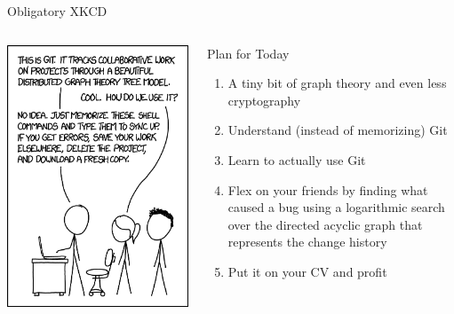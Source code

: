 \documentclass[xetex]{beamer}
\begin{document}
\begin{frame}{Obligatory XKCD}
  \begin{columns}
    \begin{column}{.5\linewidth}
      \includegraphics[width=\linewidth]{pic/xkcd1597}
    \end{column}
    \begin{column}{.5\linewidth}
      \begin{alertblock}{Plan for Today}
        \begin{enumerate}
          \item A tiny bit of graph theory and even less cryptography
          \item Understand (instead of memorizing) Git
          \item Learn to actually use Git
          \item Flex on your friends by finding what caused a bug using a
            logarithmic search over the directed acyclic graph that represents
            the change history
          \item Put it on your CV and profit
        \end{enumerate}
      \end{alertblock}
    \end{column}
  \end{columns}
\end{frame}
\end{document}

